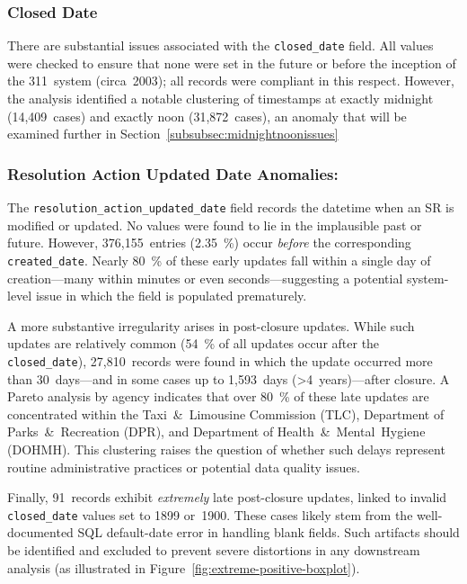 \documentclass[linenumber]{jdsart}
\begin{document}
\subsubsection{Closed Date }
\label{subsubsec:closeddate}
There are substantial issues associated with the 
\texttt{closed\_date} field. 
All values were checked to ensure that none were set in the future or 
before the inception of the 311~system (circa~2003); all records were 
compliant in this respect. 
However, the analysis identified a notable clustering of timestamps at 
exactly midnight (14{,}409~cases) and exactly noon (31{,}872~cases), 
an anomaly that will be examined further 
in Section~\ref{subsubsec:midnightnoonissues}


\subsubsection{Resolution Action Updated Date Anomalies:}
\label{subsubsec:resolutionupdatedate}
The \texttt{resolution\_action\_updated\_date} field records the 
datetime when an \textsc{SR} is modified or updated. 
No values were found to lie in the implausible past or future. 
However, 376{,}155~entries (\SI{2.35}{\percent}) occur 
\emph{before} the corresponding \texttt{created\_date}. 
Nearly \SI{80}{\percent} of these early updates fall within a 
single day of creation—many within minutes or even seconds—suggesting 
a potential system-level issue in which the field is populated 
prematurely. 

A more substantive irregularity arises in post-closure updates. 
While such updates are relatively common 
(\SI{54}{\percent} of all updates occur after the 
\texttt{closed\_date}), 27{,}810~records were found in which the update 
occurred more than 30~days—and in some cases up to 1{,}593~days 
(\textgreater4~years)—after closure. 
A Pareto analysis by agency indicates that over \SI{80}{\percent} of these 
late updates are concentrated within the 
Taxi~\&~Limousine Commission (\textsc{TLC}), 
Department of Parks~\&~Recreation (\textsc{DPR}), 
and Department of Health~\&~Mental~Hygiene (\textsc{DOHMH}). 
This clustering raises the question of whether such delays represent 
routine administrative practices or potential data quality issues.

Finally, 91~records exhibit \emph{extremely} late post-closure updates,
linked to invalid \texttt{closed\_date} values set to 1899 or~1900.
These cases likely stem from the well-documented SQL
default-date error in handling blank fields.
Such artifacts should be identified and excluded to prevent
severe distortions in any downstream analysis
(as illustrated in Figure~\ref{fig:extreme-positive-boxplot}).
\end{document}
